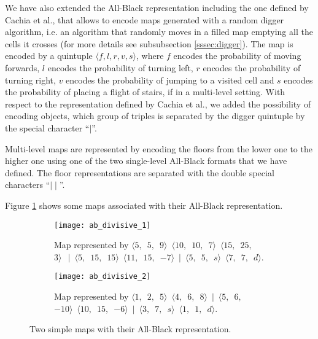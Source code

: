 \par

We have also extended the All-Black representation including the one defined by Cachia et al.\cite{MultiLevelEvolution}, that allows to encode maps generated with a random digger algorithm, i.e. an algorithm that randomly moves in a filled map emptying all the cells it crosses (for more details see subsubsection \ref{sssec:digger}). The map is encoded by a quintuple $\langle f,l,r,v,s \rangle$, where $f$ encodes the probability of moving forwards, $l$ encodes the probability of turning left, $r$ encodes the probability of turning right, $v$ encodes the probability of jumping to a visited cell and $s$ encodes the probability of placing a flight of stairs, if in a multi-level setting. With respect to the representation defined by Cachia et al., we added the possibility of encoding objects, which group of triples is separated by the digger quintuple by the special character ``$\mid$''.

\par

Multi-level maps are represented by encoding the floors from the lower one to the higher one using one of the two single-level All-Black formats that we have defined. The floor representations are separated with the double special characters ``$\mid\mid$''.

\par

Figure \ref{fig:allblack} shows some maps associated with their All-Black representation.

\begin{figure}[tp]
	\centering
  	\begin{subfigure}[t]{0.45\linewidth}
		\texttt{[image: ab\_divisive\_1]}
     		\caption{Map represented by $\langle 5, $\ $ 5, $\ $ 9 \rangle $\ $ \langle 10, $\ $ 10, $\ $ 7 \rangle $\ $  \langle 15, $\ $ 25, $\ $ 3 \rangle\ $\ $ \mid $\ $  \langle 5, $\ $ 15, $\ $ 15 \rangle $\ $  \langle 11, $\ $ 15, $\ $ -7 \rangle $\ $  \mid $\ $  \langle 5, $\ $ 5, $\ $ s \rangle $\ $  \langle 7, $\ $ 7, $\ $ d \rangle$.}
 	\end{subfigure}
  	\begin{subfigure}[t]{0.45\linewidth}
    		\texttt{[image: ab\_divisive\_2]}
     		\caption{Map represented by $\langle 1,$\ $2, $\ $5  \rangle $\ $\langle4,$\ $6,$\ $8\rangle $\ $ \mid $\ $ \langle5,$\ $6,$\ $-10\rangle $\ $ \langle10,$\ $15,$\ $-6\rangle $\ $ \mid $\ $ \langle3, $\ $7, $\ $s\rangle $\ $ \langle1, $\ $1, $\ $d\rangle$.}
  	\end{subfigure}
\caption{Two simple maps with their All-Black representation.}
\label{fig:allblack}
\end{figure}

